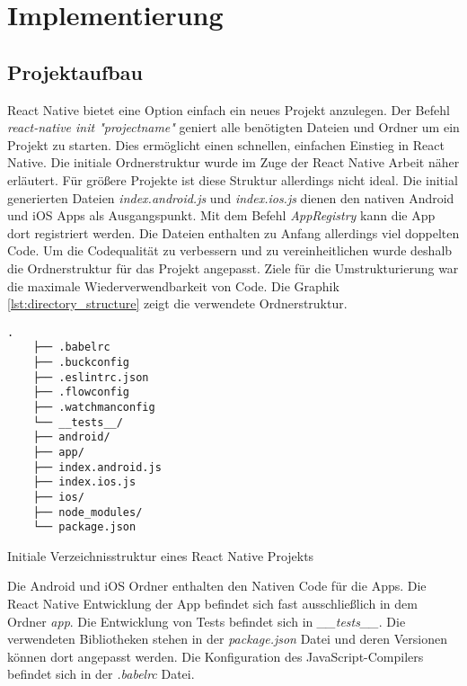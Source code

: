 \section{Implementierung}

    \subsection{Projektaufbau}
React Native bietet eine Option einfach ein neues Projekt anzulegen. Der Befehl \textit{react-native init "projectname"} geniert alle benötigten Dateien und Ordner um ein Projekt zu starten. Dies ermöglicht einen schnellen, einfachen Einstieg in React Native. Die initiale Ordnerstruktur wurde im Zuge der React Native Arbeit näher erläutert. Für größere Projekte ist diese Struktur allerdings nicht ideal. Die initial generierten Dateien \textit{index.android.js} und \textit{index.ios.js} dienen den nativen Android und iOS Apps als Ausgangspunkt. Mit dem Befehl \textit{AppRegistry} kann die App dort registriert werden. Die Dateien enthalten zu Anfang allerdings viel doppelten Code. Um die Codequalität zu verbessern und zu vereinheitlichen wurde deshalb die Ordnerstruktur für das Projekt angepasst. Ziele für die Umstrukturierung war die maximale Wiederverwendbarkeit von Code. Die Graphik \ref{lst:directory_structure} zeigt die verwendete Ordnerstruktur.

    
    \begin{lstlisting}[style=tree]
    .
    ├── .babelrc
    ├── .buckconfig
    ├── .eslintrc.json
    ├── .flowconfig
    ├── .watchmanconfig
    └── __tests__/
    ├── android/
    ├── app/
    ├── index.android.js
    ├── index.ios.js
    ├── ios/
    ├── node_modules/
    └── package.json
    \end{lstlisting}
    \vspace{-0.5 cm}
    \begin{listing}[H]
        \caption{Initiale Verzeichnisstruktur eines React Native Projekts}
        \label{lst:directory_structure}
    \end{listing}
    
 Die Android und iOS Ordner enthalten den Nativen Code für die Apps. Die React Native Entwicklung der App befindet sich fast ausschließlich in dem Ordner \textit{app}. Die Entwicklung von Tests befindet sich in \textit{\_\_tests\_\_}. Die verwendeten Bibliotheken stehen in der \textit{package.json} Datei und deren Versionen können dort angepasst werden. Die Konfiguration des JavaScript-Compilers befindet sich in der \textit{.babelrc} Datei. \\
 
